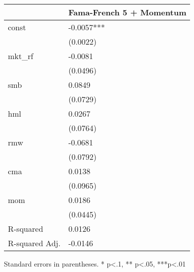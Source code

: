 \begin{table}
\caption{}
\label{}
\begin{center}
\begin{tabular}{ll}
\hline
               & Fama-French 5 + Momentum  \\
\hline
const          & -0.0057***                \\
               & (0.0022)                  \\
mkt\_rf        & -0.0081                   \\
               & (0.0496)                  \\
smb            & 0.0849                    \\
               & (0.0729)                  \\
hml            & 0.0267                    \\
               & (0.0764)                  \\
rmw            & -0.0681                   \\
               & (0.0792)                  \\
cma            & 0.0138                    \\
               & (0.0965)                  \\
mom            & 0.0186                    \\
               & (0.0445)                  \\
R-squared      & 0.0126                    \\
R-squared Adj. & -0.0146                   \\
\hline
\end{tabular}
\end{center}
\end{table}
\bigskip
Standard errors in parentheses. \newline 
* p<.1, ** p<.05, ***p<.01